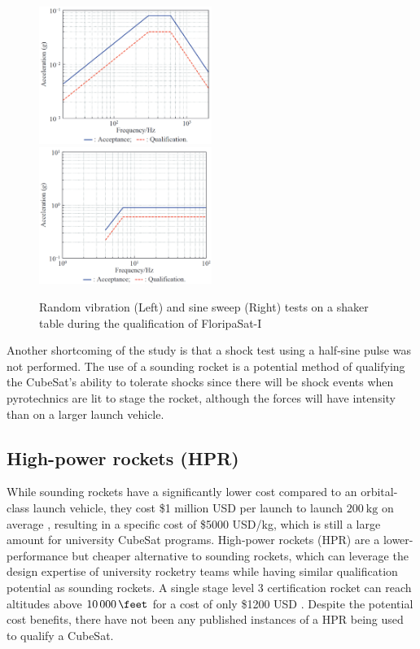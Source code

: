 \documentclass{report}
\begin{document}
\begin{figure}[H]
  \includegraphics[width=0.5\textwidth]{images/floripa-random-spectrum.png}
  \includegraphics[width=0.5\textwidth]{images/floripa-sinusoid.png}
  \caption{Random vibration (Left) and sine sweep (Right) tests on a shaker table during the qualification of FloripaSat-I \cite{9316404}}
  \label{fig:shaker}
\end{figure}

Another shortcoming of the study is that a shock test using a half-sine pulse was not performed. The use of a sounding rocket is a potential method of qualifying the CubeSat's ability to tolerate shocks since there will be shock events when pyrotechnics are lit to stage the rocket, although the forces will have intensity than on a larger launch vehicle.

\subsection{High-power rockets (HPR)}
While sounding rockets have a significantly lower cost compared to an orbital-class launch vehicle, they cost \$1 million USD per launch to launch $\SI{200}{\kilo\gram}$ on average \cite{jurist2009commercial}, resulting in a specific cost of \$5000 USD/kg, which is still a large amount for university CubeSat programs. High-power rockets (HPR) are a lower-performance but cheaper alternative to sounding rockets, which can leverage the design expertise of university rocketry teams while having similar qualification potential as sounding rockets. A single stage level 3 certification rocket can reach altitudes above $\SI{10000}{\feet}$ \cite{canepa2005modern} for a cost of only \$1200 USD \cite{canepa2005modern}. Despite the potential cost benefits, there have not been any published instances of a HPR being used to qualify a CubeSat.
\end{document}
